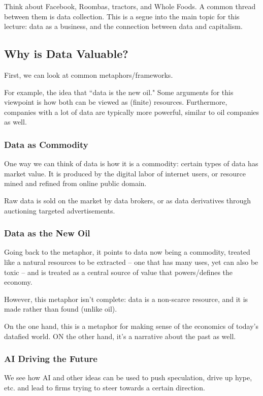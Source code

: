 \documentclass[openany]{book}
\begin{document}
\begin{example}
	Think about Facebook, Roombas, tractors, and Whole Foods. A common thread between them is data collection. This is a segue into the main topic for this lecture: data as a business, and the connection between data and capitalism.
\end{example}

\subsection{Why is Data Valuable?}
First, we can look at common metaphors/frameworks.

\begin{example}
	For example, the idea that ``data is the new oil." Some arguments for this viewpoint is how both can be viewed as (finite) resources. Furthermore, companies with a lot of data are typically more powerful, similar to oil companies as well.
\end{example}

\subsubsection{Data as Commodity}
One way we can think of data is how it is a commodity: certain types of data has market value. It is produced by the digital labor of internet users, or resource mined and refined from online public domain.

Raw data is sold on the market by data brokers, or as data derivatives through auctioning targeted advertisements.

\subsubsection{Data as the New Oil}
Going back to the metaphor, it points to data now being a commodity, treated like a natural resources to be extracted -- one that has many uses, yet can also be toxic -- and is treated as a central source of value that powers/defines the economy.

However, this metaphor isn't complete: data is a non-scarce resource, and it is made rather than found (unlike oil).

On the one hand, this is a metaphor for making sense of the economics of today's datafied world. ON the other hand, it's a narrative about the past as well.

\subsubsection{AI Driving the Future}
We see how AI and other ideas can be used to push speculation, drive up hype, etc. and lead to firms trying to steer towards a certain direction.
\end{document}
